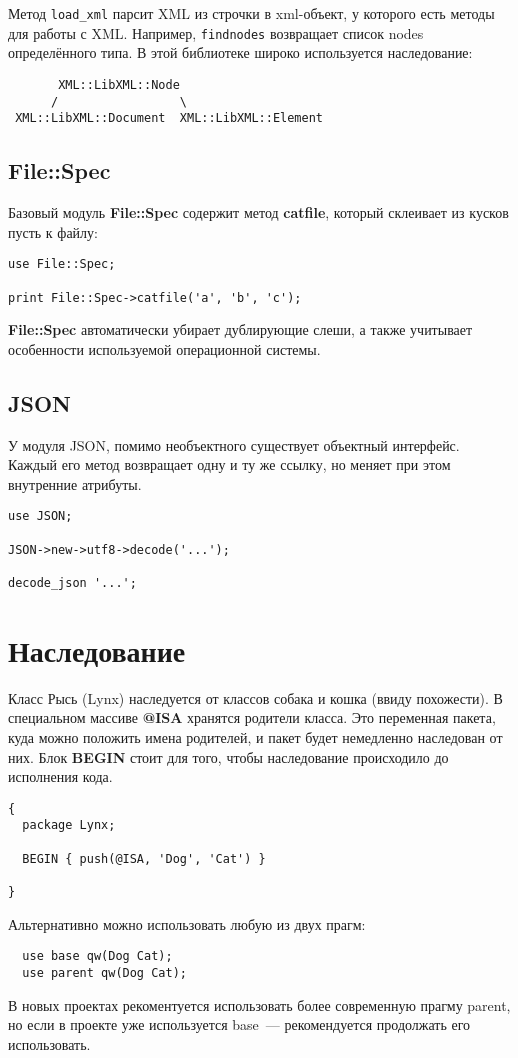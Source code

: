 Метод \verb|load_xml| парсит XML из строчки в xml-объект, у которого есть методы для работы с XML. Например, \verb|findnodes| возвращает список nodes определённого типа. В этой библиотеке широко используется наследование:
\begin{verbatim}
       XML::LibXML::Node
      /                 \
 XML::LibXML::Document  XML::LibXML::Element
\end{verbatim}

\subsection{File::Spec}%
Базовый модуль \textbf{File::Spec} содержит метод \textbf{catfile}, который склеивает из кусков пусть к файлу:
\begin{verbatim}
use File::Spec;

print File::Spec->catfile('a', 'b', 'c');
\end{verbatim}
\textbf{File::Spec} автоматически убирает дублирующие слеши, а также учитывает особенности используемой операционной системы.

\subsection{JSON} %
У модуля JSON, помимо необъектного существует объектный интерфейс.
Каждый его метод возвращает одну и ту же ссылку, но меняет при этом внутренние атрибуты.
\begin{verbatim}
use JSON;

JSON->new->utf8->decode('...');

decode_json '...';
\end{verbatim}


\section{Наследование}%
Класс Рысь (Lynx) наследуется от классов собака и кошка (ввиду похожести). В специальном массиве \textbf{@ISA} хранятся родители класса. Это переменная пакета, куда можно положить имена родителей, и пакет будет немедленно наследован от них. Блок \textbf{BEGIN} стоит для того, чтобы наследование происходило до исполнения кода.
\begin{verbatim}
{
  package Lynx;

  BEGIN { push(@ISA, 'Dog', 'Cat') }

}
\end{verbatim}
Альтернативно можно использовать любую из двух прагм:
\begin{verbatim}
  use base qw(Dog Cat);
  use parent qw(Dog Cat);
\end{verbatim}
В новых проектах рекоментуется использовать более современную прагму parent, но если в проекте уже используется base~--- рекомендуется продолжать его использовать.

